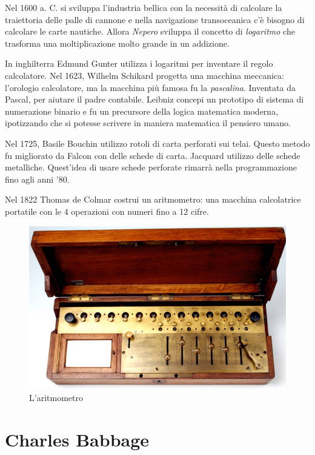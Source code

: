 Nel 1600 a. C. si sviluppa l'industria bellica con la necessità di calcolare la traiettoria delle palle di cannone e nella navigazione transoceanica c'è bisogno di calcolare le carte nautiche. Allora \textit{Nepero} sviluppa il concetto di \textit{logaritmo} che trasforma una moltiplicazione molto grande in un addizione.

In inghilterra Edmund Gunter utilizza i logaritmi per inventare il regolo calcolatore. Nel 1623, Wilhelm Schikard progetta una macchina meccanica: l'orologio calcolatore, ma la macchina più famosa fu la \textit{pascalina}. Inventata da Pascal, per aiutare il padre contabile. Leibniz concepi un prototipo di sistema di numerazione binario e fu un precursore della logica matematica moderna, ipotizzando che si potesse scrivere in maniera matematica il pensiero umano.

Nel 1725, Basile Bouchin utilizzo rotoli di carta perforati sui telai. Questo metodo fu migliorato da Falcon con delle schede di carta. Jacquard utilizzo delle schede metalliche. Quest'idea di usare schede perforate rimarrà nella programmazione fino agli anni '80.

Nel 1822 Thomas de Colmar costrui un aritmometro: una macchina calcolatrice portatile con le 4 operazioni con numeri fino a 12 cifre.

\begin{figure}[!h]
    \centering
    \includegraphics[scale = 0.5]{images/storia arch/Aritmometro.png}
    \caption{L'aritmometro}
    \label{fig:aritmometro}
\end{figure}

\section{Charles Babbage}

